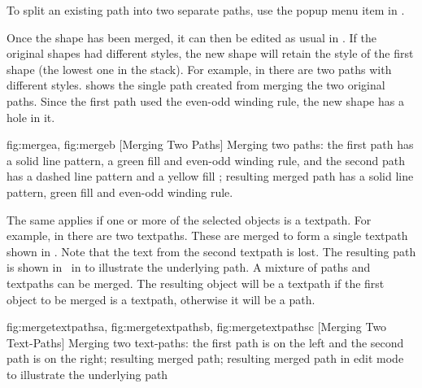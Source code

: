 \begin{information}
To split an existing \gls{path} into two separate \glspl{path}, use the
 popup menu item in \editpathmode.
\end{information}

Once the shape has been merged, it can then be edited as usual in
\editpathmode.  If the original shapes had different styles, the new
shape will retain the style of the first shape (the lowest one in
the \gls{stack}). For example, in  there are
two \glspl{path} with different styles.  shows
the single \gls{path} created from merging the two original paths.
Since the first path used the even-odd winding rule, the new shape
has a hole in it.

{
  {fig:mergea}{}{},
  {fig:mergeb}{}{}
}
[Merging Two Paths]
{Merging two paths:
 the first path has a solid line pattern, a
green fill  and even-odd winding rule, and the second
path has a dashed line pattern and a yellow fill ;
 resulting merged path has a solid line
pattern, green fill  and even-odd winding rule.}

The same applies if one or more of the selected \glspl*{object} is a
\gls{textpath}. For example, in 
there are two \glspl*{textpath}.  These are merged to form a single
\gls*{textpath} shown in . Note that
the text from the second \gls{textpath} is lost. The resulting path
is shown in \editpathmode\ in  to
illustrate the underlying path. A mixture of \glspl*{path} and
\glspl*{textpath} can be merged. The resulting \gls*{object} will be
a \gls*{textpath} if the first object to be merged is a
\gls*{textpath}, otherwise it will be a \gls*{path}.

{
  {fig:mergetextpathsa}{}{},
  {fig:mergetextpathsb}{}{},
  {fig:mergetextpathsc}{}{}
}
[Merging Two Text-Paths]
{Merging two text-paths:
 the first path is on the left and
the second path is on the right;
 resulting merged path;
 resulting merged path in
edit mode to illustrate the underlying path}


